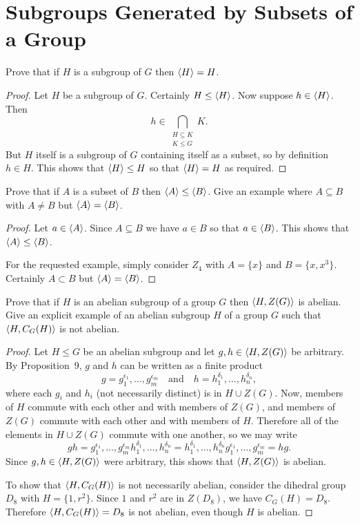 \section{Subgroups Generated by Subsets of a Group}

 Prove that if $H$ is a subgroup of $G$ then $\langle{H}\rangle = H$.
\begin{proof}
  Let $H$ be a subgroup of $G$. Certainly $H\leq\langle{H}\rangle$. Now suppose
  $h\in\langle{H}\rangle$. Then
  \begin{equation*}
    h\in\bigcap_{\substack{H\subseteq K \\ K\leq G}} K.
  \end{equation*}
  But $H$ itself is a subgroup of $G$ containing itself as a subset,
  so by definition $h\in H$. This shows that $\langle{H}\rangle\leq H$ so that
  $\langle{H}\rangle = H$ as required.
\end{proof}

 Prove that if $A$ is a subset of $B$ then
$\langle{A}\rangle\leq\langle{B}\rangle$. Give an example where $A\subseteq B$ with
$A\neq B$ but $\langle{A}\rangle=\langle{B}\rangle$.
\begin{proof}
  Let $a\in\langle{A}\rangle$. Since $A\subseteq B$ we have $a\in B$ so that
  $a\in\langle{B}\rangle$. This shows that $\langle{A}\rangle\leq\langle{B}\rangle$.

  For the requested example, simply consider $Z_4$ with $A = \{x\}$
  and $B = \{x, x^3\}$. Certainly $A\subset B$ but
  $\langle{A}\rangle = \langle{B}\rangle$.
\end{proof}

 Prove that if $H$ is an abelian subgroup of a group $G$
then $\langle{H, Z(G)}\rangle$ is abelian. Give an explicit example of an
abelian subgroup $H$ of a group $G$ such that $\langle{H, C_G(H)}\rangle$ is not
abelian.
\begin{proof}
  Let $H\leq G$ be an abelian subgroup and let $g,h\in\langle{H, Z(G)}\rangle$
  be arbitrary. By Proposition~9, $g$ and $h$ can be written as a
  finite product
  \begin{equation*}
    g = g_1^{\epsilon_1},\dots,g_m^{\epsilon_m}
    \quad\text{and}\quad
    h = h_1^{\delta_1},\dots,h_n^{\delta_n},
  \end{equation*}
  where each $g_i$ and $h_i$ (not necessarily distinct) is in
  $H\cup Z(G)$. Now, members of $H$ commute with each other and with
  members of $Z(G)$, and members of $Z(G)$ commute with each other and
  with members of $H$. Therefore all of the elements in $H\cup Z(G)$
  commute with one another, so we may write
  \begin{equation*}
    gh = g_1^{\epsilon_1},\dots,g_m^{\epsilon_m}
    h_1^{\delta_1},\dots,h_n^{\delta_n}
    = h_1^{\delta_1},\dots,h_n^{\delta_n}
    g_1^{\epsilon_1},\dots,g_m^{\epsilon_m} = hg.
  \end{equation*}
  Since $g,h\in\langle{H, Z(G)}\rangle$ were arbitrary, this shows that
  $\langle{H, Z(G)}\rangle$ is abelian.

  To show that $\langle{H, C_G(H)}\rangle$ is not necessarily abelian, consider
  the dihedral group $D_8$ with $H = \{1, r^2\}$. Since $1$ and $r^2$
  are in $Z(D_8)$, we have $C_G(H) = D_8$. Therefore
  $\langle{H, C_G(H)}\rangle = D_8$ is not abelian, even though $H$ is abelian.
\end{proof}

